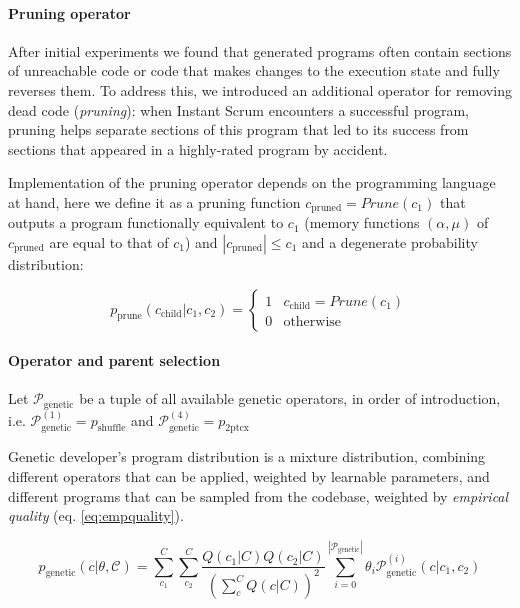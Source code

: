 \paragraph{Pruning operator}

After initial experiments  we found that generated programs often contain sections of unreachable code or code that makes changes to the execution state and fully reverses them.
To address this, we introduced an additional operator for removing dead code (\emph{pruning}): when Instant Scrum encounters a successful program, pruning helps separate sections of this program that led to its success from sections that appeared in a highly-rated program by accident.  

Implementation of the pruning operator depends on the programming language at hand, here we define it as a pruning function $c_\text{pruned}=\mathit{Prune}(c_1)$ that outputs a program functionally equivalent to $c_1$ (memory functions $(\alpha,\mu)$ of $c_\text{pruned}$ are equal to that of $c_1$) and $|c_\text{pruned}| \leq c_1$ and a degenerate probability distribution:

\begin{equation}
    p_\text{prune}(c_\text{child}|c_1,c_2)= \begin{cases}
        1 & c_\text{child} = \mathit{Prune}(c_1) \\
        0 & \text{otherwise}
        \end{cases}
\end{equation}

\paragraph{Operator and parent selection}
\label{sec:selection}

Let $\mathcal{P}_\text{genetic}$ be a tuple of all available genetic operators, in order of introduction, i.e. $\mathcal{P}_\text{genetic}^{(1)}=p_\text{shuffle}$ and $\mathcal{P}_\text{genetic}^{(4)}=p_\text{2ptcx}$

Genetic developer's program distribution is a mixture distribution, combining different operators that can be applied, weighted by learnable parameters, and different programs that can be sampled from the codebase, weighted by \emph{empirical quality} (eq. \ref{eq:empquality}).

\begin{equation}
    p_\text{genetic}(c | \theta, \mathcal{C}) = 
    \sum\limits_{c_1}^{C}  
    \sum\limits_{c_2}^{C} 
    \frac{Q(c_1|C) Q(c_2|C)}{(\sum\limits_{c}^{C} Q(c|C))^2} 
    \sum\limits_{i=0}^{|\mathcal{P}_\text{genetic}|} 
    \theta_i \mathcal{P}_\text{genetic}^{(i)} (c|c_1,c_2)
    \label{eq:genmixture}
\end{equation}

